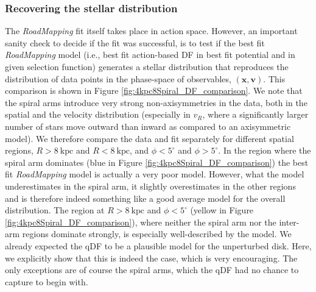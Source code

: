 \documentclass[iop,revtex4,numberedappendix,appendixfloats]{emulateapj}
\newcommand{\vect}[1]{\boldsymbol{#1}}
\newcommand{\RM}{{\sl RoadMapping}}
\begin{document}
\subsubsection{Recovering the stellar distribution} \label{sec:4kpc8Spiral_DF}

The \RM{} fit itself takes place in action space. However, an important sanity check to decide if the fit was successful, is to test if the best fit \RM{} model (i.e., best fit action-based DF in best fit potential and in given selection function) generates a stellar distribution that reproduces the distribution of data points in the phase-space of observables, $(\vect{x},\vect{v})$. This comparison is shown in Figure \ref{fig:4kpc8Spiral_DF_comparison}. 
We note that the spiral arms introduce very strong non-axisymmetries in the data, both in the spatial and the velocity distribution (especially in $v_R$, where a significantly larger number of stars move outward than inward as compared to an axisymmetric model). We therefore compare the data and fit separately for different spatial regions, $R>8~\text{kpc}$ and $R<8~\text{kpc}$, and $\phi<5^\circ$ and $\phi>5^\circ$. In the region where the spiral arm dominates (blue in Figure \ref{fig:4kpc8Spiral_DF_comparison}) the best fit \RM{} model is actually a very poor model. However, what the model underestimates in the spiral arm, it slightly overestimates in the other regions and is therefore indeed something like a good average model for the overall distribution. The region at $R>8~\text{kpc}$ and $\phi<5^\circ$ (yellow in Figure \ref{fig:4kpc8Spiral_DF_comparison}), where neither the spiral arm nor the inter-arm regions dominate strongly, is especially well-described by the model. We already expected the qDF to be a plausible model for the unperturbed disk. Here, we explicitly show that this is indeed the case, which is very encouraging. The only exceptions are of course the spiral arms, which the qDF had no chance to capture to begin with.
\end{document}
